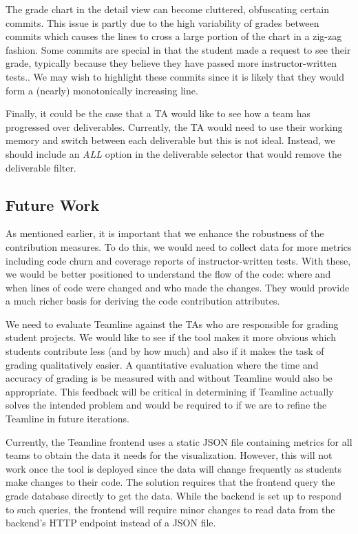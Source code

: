 \documentclass[../manifest.tex]{subfiles}
\begin{document}
The grade chart in the detail view can become cluttered, obfuscating certain commits. This issue is partly due to the high variability of grades between commits which causes the lines to cross a large portion of the chart in a zig-zag fashion. Some commits are special in that the student made a request to see their grade, typically because they believe they have passed more instructor-written tests.. We may wish to highlight these commits since it is likely that they would form a (nearly) monotonically increasing line.

Finally, it could be the case that a TA would like to see how a team has progressed over deliverables. Currently, the TA would need to use their working memory and switch between each deliverable but this is not ideal. Instead, we should include an \textit{ALL} option in the deliverable selector that would remove the deliverable filter.


\subsection{Future Work}
As mentioned earlier, it is important that we enhance the robustness of the contribution measures. To do this, we would need to collect data for more metrics including code churn and coverage reports of instructor-written tests. With these, we would be better positioned to understand the flow of the code: where and when lines of code were changed and who made the changes. They would provide a much richer basis for deriving the code contribution attributes.

We need to evaluate Teamline against the TAs who are responsible for grading student projects. We would like to see if the tool makes it more obvious which students contribute less (and by how much) and also if it makes the task of grading qualitatively easier. A quantitative evaluation where the time and accuracy of grading is be measured with and without Teamline would also be appropriate. This feedback will be critical in determining if Teamline actually solves the intended problem and would be required to if we are to refine the Teamline in future iterations.

Currently, the Teamline frontend uses a static JSON file containing metrics for all teams to obtain the data it needs for the visualization. However, this will not work once the tool is deployed since the data will change frequently as students make changes to their code. The solution requires that the frontend query the grade database directly to get the data. While the backend is set up to respond to such queries, the frontend will require minor changes to read data from the backend's HTTP endpoint instead of a JSON file.
\end{document}
